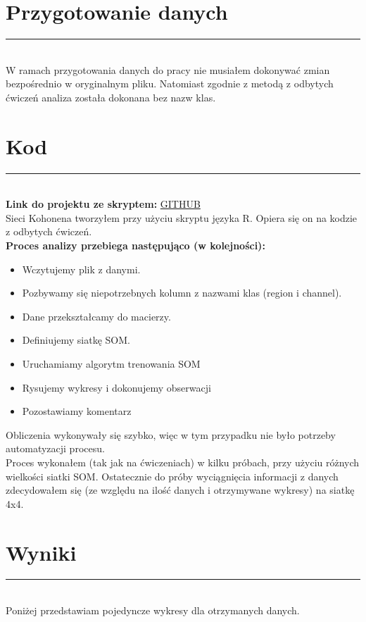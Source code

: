 \documentclass[a4paper,12pt]{article}
\newcommand{\linia}{\rule{\linewidth}{0.5pt}}
\theoremstyle{mytheor}
\begin{document}
\section*{Przygotowanie danych}
\linia\\
 W ramach przygotowania danych do pracy nie musiałem dokonywać zmian bezpośrednio w oryginalnym pliku. Natomiast zgodnie z metodą z odbytych ćwiczeń analiza została dokonana bez nazw klas.
 
\section*{Kod}
\linia\\
\textbf{Link do projektu ze skryptem:} \textcolor{red}{\href{https://github.com/bvdzynski/up_ai-lab/tree/master/lab9_project_wholesale_customers}{GITHUB}}\\

Sieci Kohonena tworzyłem przy użyciu skryptu języka R. Opiera się on na kodzie z odbytych ćwiczeń.\\

\textbf{Proces analizy przebiega następująco (w kolejności):}
\begin{itemize}
 \item Wczytujemy plik z danymi.
 \item Pozbywamy się niepotrzebnych kolumn z nazwami klas (region i channel).
 \item Dane przekształcamy do macierzy.
 \item Definiujemy siatkę SOM.
 \item Uruchamiamy algorytm trenowania SOM
 \item Rysujemy wykresy i dokonujemy obserwacji
 \item Pozostawiamy komentarz
\end{itemize}

Obliczenia wykonywały się szybko, więc w tym przypadku nie było potrzeby automatyzacji procesu.\\

Proces wykonałem (tak jak na ćwiczeniach) w kilku próbach, przy użyciu różnych wielkości siatki SOM. Ostatecznie do próby wyciągnięcia informacji z danych zdecydowałem się (ze względu na ilość danych i otrzymywane wykresy) na siatkę 4x4.

\section*{Wyniki}
\linia\\
Poniżej przedstawiam pojedyncze wykresy dla otrzymanych danych.
\end{document}
